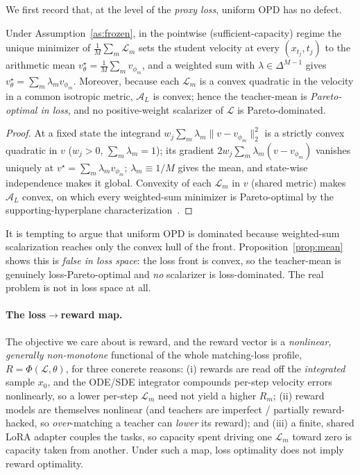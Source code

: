 We first record that, at the level of the \emph{proxy loss}, uniform OPD has no defect.

\begin{proposition}
\label{prop:mean}
Under Assumption~\ref{as:frozen}, in the pointwise (sufficient-capacity) regime the
unique minimizer of $\tfrac1M\sum_m\mathcal L_m$ sets the student velocity at every
$(x_{t_j},t_j)$ to the arithmetic mean
$v_\theta^\star=\tfrac1M\sum_m v_{\phi_m}$, and a weighted sum with $\lambda\in\Delta^{M-1}$
gives $v_\theta^\star=\sum_m\lambda_m v_{\phi_m}$. Moreover, because each $\mathcal L_m$
is a convex quadratic in the velocity in a common isotropic metric, $\mathcal A_L$ is
convex; hence the teacher-mean is \emph{Pareto-optimal in loss}, and no positive-weight
scalarizer of $\mathcal L$ is Pareto-dominated.
\end{proposition}

\begin{proof}
At a fixed state the integrand $w_j\sum_m\lambda_m\|v-v_{\phi_m}\|_2^2$ is a strictly
convex quadratic in $v$ ($w_j>0$, $\sum_m\lambda_m=1$); its gradient
$2w_j\sum_m\lambda_m(v-v_{\phi_m})$ vanishes uniquely at $v^\star=\sum_m\lambda_m v_{\phi_m}$;
$\lambda_m\equiv1/M$ gives the mean, and state-wise independence makes it global.
Convexity of each $\mathcal L_m$ in $v$ (shared metric) makes $\mathcal A_L$ convex, on
which every weighted-sum minimizer is Pareto-optimal by the supporting-hyperplane
characterization~\cite[\S4.7.5]{boyd2004convex,miettinen1999nonlinear}.
\end{proof}

\begin{remark}
\label{rem:notconvexhull}
It is tempting to argue that uniform OPD is dominated because weighted-sum scalarization
reaches only the convex hull of the front. Proposition~\ref{prop:mean} shows this is
\emph{false in loss space}: the loss front is convex, so the teacher-mean is genuinely
loss-Pareto-optimal and \emph{no} scalarizer is loss-dominated. The real problem is not
in loss space at all.
\end{remark}

\paragraph{The loss$\to$reward map.}
The objective we care about is reward, and the reward vector is a \emph{nonlinear,
generally non-monotone} functional of the whole matching-loss profile,
$R=\Phi(\mathcal L,\theta)$, for three concrete reasons: (i) rewards are read off the
\emph{integrated} sample $x_0$, and the ODE/SDE integrator compounds per-step velocity
errors nonlinearly, so a lower per-step $\mathcal L_m$ need not yield a higher $R_m$;
(ii) reward models are themselves nonlinear (and teachers are imperfect / partially
reward-hacked, so \emph{over}-matching a teacher can \emph{lower} its reward); and
(iii) a finite, shared LoRA adapter couples the tasks, so capacity spent driving one
$\mathcal L_m$ toward zero is capacity taken from another. Under such a map, loss
optimality does not imply reward optimality.

